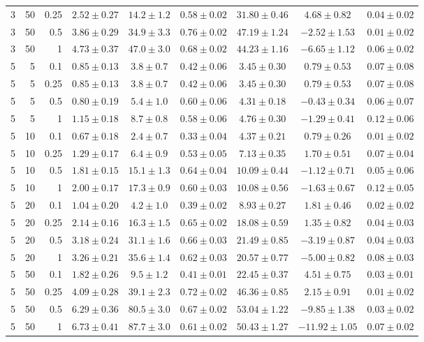 \begin{table}[htbp]
\begin{tabular}{@{}rrrcccccc@{}}
3 & 50 & 0.25 & $2.52 \pm 0.27$ & $14.2 \pm 1.2$ & $0.58 \pm 0.02$ & $31.80 \pm 0.46$ & $4.68 \pm 0.82$ & $0.04 \pm 0.02$ \\
3 & 50 & 0.5 & $3.86 \pm 0.29$ & $34.9 \pm 3.3$ & $0.76 \pm 0.02$ & $47.19 \pm 1.24$ & $-2.52 \pm 1.53$ & $0.01 \pm 0.02$ \\
3 & 50 & 1 & $4.73 \pm 0.37$ & $47.0 \pm 3.0$ & $0.68 \pm 0.02$ & $44.23 \pm 1.16$ & $-6.65 \pm 1.12$ & $0.06 \pm 0.02$ \\
\midrule
5 & 5 & 0.1 & $0.85 \pm 0.13$ & $3.8 \pm 0.7$ & $0.42 \pm 0.06$ & $3.45 \pm 0.30$ & $0.79 \pm 0.53$ & $0.07 \pm 0.08$ \\
5 & 5 & 0.25 & $0.85 \pm 0.13$ & $3.8 \pm 0.7$ & $0.42 \pm 0.06$ & $3.45 \pm 0.30$ & $0.79 \pm 0.53$ & $0.07 \pm 0.08$ \\
5 & 5 & 0.5 & $0.80 \pm 0.19$ & $5.4 \pm 1.0$ & $0.60 \pm 0.06$ & $4.31 \pm 0.18$ & $-0.43 \pm 0.34$ & $0.06 \pm 0.07$ \\
5 & 5 & 1 & $1.15 \pm 0.18$ & $8.7 \pm 0.8$ & $0.58 \pm 0.06$ & $4.76 \pm 0.30$ & $-1.29 \pm 0.41$ & $0.12 \pm 0.06$ \\
5 & 10 & 0.1 & $0.67 \pm 0.18$ & $2.4 \pm 0.7$ & $0.33 \pm 0.04$ & $4.37 \pm 0.21$ & $0.79 \pm 0.26$ & $0.01 \pm 0.02$ \\
5 & 10 & 0.25 & $1.29 \pm 0.17$ & $6.4 \pm 0.9$ & $0.53 \pm 0.05$ & $7.13 \pm 0.35$ & $1.70 \pm 0.51$ & $0.07 \pm 0.04$ \\
5 & 10 & 0.5 & $1.81 \pm 0.15$ & $15.1 \pm 1.3$ & $0.64 \pm 0.04$ & $10.09 \pm 0.44$ & $-1.12 \pm 0.71$ & $0.05 \pm 0.06$ \\
5 & 10 & 1 & $2.00 \pm 0.17$ & $17.3 \pm 0.9$ & $0.60 \pm 0.03$ & $10.08 \pm 0.56$ & $-1.63 \pm 0.67$ & $0.12 \pm 0.05$ \\
5 & 20 & 0.1 & $1.04 \pm 0.20$ & $4.2 \pm 1.0$ & $0.39 \pm 0.02$ & $8.93 \pm 0.27$ & $1.81 \pm 0.46$ & $0.02 \pm 0.02$ \\
5 & 20 & 0.25 & $2.14 \pm 0.16$ & $16.3 \pm 1.5$ & $0.65 \pm 0.02$ & $18.08 \pm 0.59$ & $1.35 \pm 0.82$ & $0.04 \pm 0.03$ \\
5 & 20 & 0.5 & $3.18 \pm 0.24$ & $31.1 \pm 1.6$ & $0.66 \pm 0.03$ & $21.49 \pm 0.85$ & $-3.19 \pm 0.87$ & $0.04 \pm 0.03$ \\
5 & 20 & 1 & $3.26 \pm 0.21$ & $35.6 \pm 1.4$ & $0.62 \pm 0.03$ & $20.57 \pm 0.77$ & $-5.00 \pm 0.82$ & $0.08 \pm 0.03$ \\
5 & 50 & 0.1 & $1.82 \pm 0.26$ & $9.5 \pm 1.2$ & $0.41 \pm 0.01$ & $22.45 \pm 0.37$ & $4.51 \pm 0.75$ & $0.03 \pm 0.01$ \\
5 & 50 & 0.25 & $4.09 \pm 0.28$ & $39.1 \pm 2.3$ & $0.72 \pm 0.02$ & $46.36 \pm 0.85$ & $2.15 \pm 0.91$ & $0.01 \pm 0.02$ \\
5 & 50 & 0.5 & $6.29 \pm 0.36$ & $80.5 \pm 3.0$ & $0.67 \pm 0.02$ & $53.04 \pm 1.22$ & $-9.85 \pm 1.38$ & $0.03 \pm 0.02$ \\
5 & 50 & 1 & $6.73 \pm 0.41$ & $87.7 \pm 3.0$ & $0.61 \pm 0.02$ & $50.43 \pm 1.27$ & $-11.92 \pm 1.05$ & $0.07 \pm 0.02$ \\
\bottomrule
\end{tabular}
\end{table}
